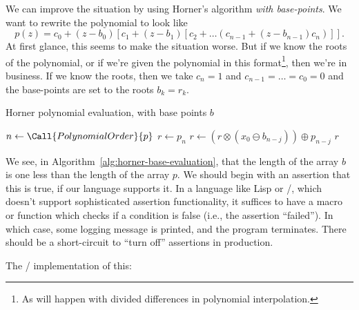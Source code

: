 We can improve the situation by using Horner's algorithm
\emph{with base-points}. We want to rewrite the polynomial to look like
\begin{equation}
  p(z) = c_{0} + (z - b_{0})[c_{1} + (z - b_{1})[c_{2} + \dots (c_{n-1}
      + (z - b_{n-1})c_{n})]].
\end{equation}
At first glance, this seems to make the situation worse. But if we know
the roots of the polynomial, or if we're given the polynomial in this
format\footnote{As will happen with divided differences in polynomial
interpolation.}, then we're in business. If we know the roots, then we
take $c_{n}=1$ and $c_{n-1}=\dots=c_{0}=0$ and the base-points are set
to the roots $b_{k}=r_{k}$.

\begin{algorithm}\label{alg:horner-base-evaluation}
  \caption{Horner polynomial evaluation, with base points $b$}
  \begin{algorithmic}[1]
     
      \State$n\gets\Call{PolynomialOrder}{p}$
      \State$r\gets p_{n}$
        \State $r\gets (r\otimes (x_{0} \ominus b_{n-j})) \oplus p_{n-j}$
      \EndFor
      \State \Return $r$
    \EndFunction
\end{algorithmic}
\end{algorithm}

\begin{lesson}
  We see, in Algorithm~\ref{alg:horner-base-evaluation}, that the length
  of the array $b$ is one less than the length of the array $p$. We
  should begin with an assertion that this is true, if our language
  supports it. In a language like Lisp or \CEE/, which doesn't support
  sophisticated assertion functionality, it suffices to have a macro or
  function which checks if a condition is false (i.e., the assertion
  ``failed''). In which case, some logging message is printed, and the
  program terminates. There should be a short-circuit to ``turn off''
  assertions in production.
\end{lesson}

\begin{chunk}
  The \FORTRAN/ implementation of this:
  
\end{chunk}



